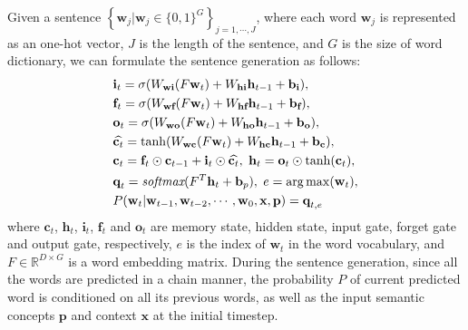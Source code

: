 \documentclass[10pt,twocolumn,letterpaper]{article}
\begin{document}
Given a sentence
$\left\{ {{{\textbf{w}}_j}}| {{\textbf{w}}_j} \in {\{0,1\}^{G}}  \right\}_{j=1,\cdots,J}$,
where each word ${{\textbf{w}}_j}$ is represented as an one-hot vector,
$J$ is the length of the sentence, and $G$ is the size of word dictionary,
we can formulate the sentence generation as follows:
\begin{equation}\label{eqn:e4}
\setlength{\abovedisplayskip}{5pt}
\setlength{\belowdisplayskip}{5pt}
\begin{aligned}
&{\textbf{i}_t} = \sigma ({W_{\textbf{w}\textbf{i}}}(F{\textbf{w}_t}) + {W_{\textbf{h}\textbf{i}}}{\textbf{h}_{t - 1}} + {\textbf{b}_\textbf{i}}), \\
&{\textbf{f}_t} = \sigma ({{W}_{\textbf{w}\textbf{f}}}(F{\textbf{w}_t}) + {W_{\textbf{h}\textbf{f}}}{\textbf{h}_{t - 1}} + {\textbf{b}_\textbf{f}}),\\
&{\textbf{o}_t} = \sigma ({W_{\textbf{w}\textbf{o}}}(F{\textbf{w}_t}) + {W_{\textbf{h}\textbf{o}}}{\textbf{h}_{t - 1}} + {\textbf{b}_\textbf{o}}),\\
&\widehat {\textbf{c}_t} = \tanh ({W_{\textbf{w}\textbf{c}}}(F{\textbf{w}_t}) + {W_{\textbf{h}\textbf{c}}}{\textbf{h}_{t - 1}} + {\textbf{b}_\textbf{c}}),\\
&{\textbf{c}_t} = {\textbf{f}_t}\odot{\textbf{c}_{t - 1}} + {\textbf{i}_t}\odot\widehat {\textbf{c}_t},  {\kern 3pt}  {\textbf{h}_t} = {\textbf{o}_t}\odot\tanh ({\textbf{c}_t}),\\
&{\textbf{q}_{t}} = \emph{softmax}({F^T}{\textbf{h}_{t}} + {\textbf{b}_p})
, {\kern 3pt} e = \arg \max ({\textbf{w}_{t}}), \\
&P(\textbf{w}_{t}|\textbf{w}_{t-1}, \textbf{w}_{t-2},\cdots,\textbf{w}_0,\textbf{x},\textbf{p}) = {\textbf{q}_{t,e}}
\end{aligned}
\end{equation}
where ${\textbf{c}_t}$, ${\textbf{h}_t}$, $\textbf{i}_{t}$,
$\textbf{f}_{t}$ and $\textbf{o}_{t}$ are memory state, hidden state,
input gate, forget gate and output gate, respectively,
$e$ is the index of ${\textbf{w}_{t}}$ in the word vocabulary,
and $F\in {\mathbb{R}^{D \times G}}$ is a word embedding matrix.
During the sentence generation,
since all the words are predicted in a chain manner,
the probability $P$ of current predicted word
is conditioned on all its previous words,
as well as the input semantic concepts ${\textbf{p}}$ and context ${\textbf{x}}$ at the initial timestep.
\end{document}
